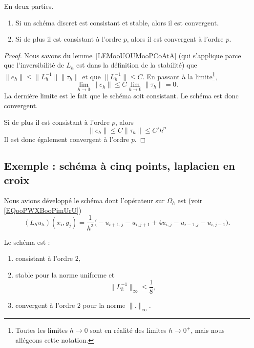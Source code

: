 \begin{theorem}     \label{THOooEPQQooUQMcgF}
	En deux parties.
	\begin{enumerate}
		\item
		      Si un schéma discret est consistant et stable, alors il est convergent.
		\item
		      Si de plus il est consistant à l'ordre \( p\), alors il est convergent à l'ordre \( p\).
	\end{enumerate}
\end{theorem}

\begin{proof}
	Nous savons du lemme~\ref{LEMooUOUMooPCoAtA} (qui s'applique parce que l'inversibilité de \( L_h\) est dans la définition de la stabilité) que  \( \| e_h \|\leq \| L_h^{-1} \| \| \tau_h \|\) et que  \( \| L_h^{-1} \|\leq C  \). En passant à la limite\footnote{Toutes les limites \( h\to 0\) sont en réalité des limites \( h\to 0^+\), mais nous allégeons cette notation.},
	\begin{equation}
		\lim_{h\to 0} \| e_h \|\leq C\lim_{h\to 0} \| \tau_h \|=0.
	\end{equation}
	La dernière limite est le fait que le schéma soit consistant. Le schéma est donc convergent.

	Si de plus il est consistant à l'ordre \( p\), alors
	\begin{equation}
		\| e_h \|\leq C\| \tau_h \|\leq C'h^p
	\end{equation}
	Il est donc également convergent à l'ordre \( p\).
\end{proof}

\subsection{Exemple : schéma à cinq points, laplacien en croix}

Nous avions développé le schéma dont l'opérateur sur \( \Omega_h\) est (voir \eqref{EQooPWXBooPimUrU})
\begin{equation}
	(L_hu_h)(x_i,y_j)=\frac{1}{ h^2 }\big( -u_{i+1,j}-u_{i,j+1} +4u_{i,j}-u_{i-1,j}-u_{i,j-1}  \big).
\end{equation}

\begin{proposition}
	Le schéma est :
	\begin{enumerate}
		\item
		      consistant à l'ordre \( 2\),
		\item
		      stable pour la norme uniforme et
		      \begin{equation}
			      \| L_h^{-1} \|_{\infty}\leq \frac{1}{ 8 },
		      \end{equation}
		\item
		      convergent à l'ordre \( 2\) pour la norme \( \| . \|_{\infty}\).
	\end{enumerate}
\end{proposition}

